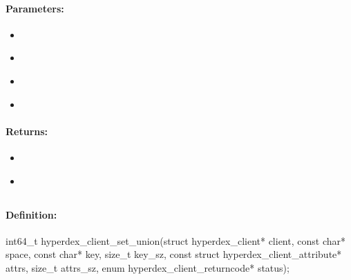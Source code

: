 \paragraph{Parameters:}
\begin{itemize}[noitemsep]
\item {}\\

\item {}\\

\item {}\\

\item {}\\

\end{itemize}

\paragraph{Returns:}
\begin{itemize}[noitemsep]
\item {}\\

\item {}\\

\end{itemize}

\pagebreak
\subsection{}
\label{api:c:set_union}


\paragraph{Definition:}
\begin{ccode}
int64_t hyperdex_client_set_union(struct hyperdex_client* client,
        const char* space,
        const char* key, size_t key_sz,
        const struct hyperdex_client_attribute* attrs, size_t attrs_sz,
        enum hyperdex_client_returncode* status);
\end{ccode}


